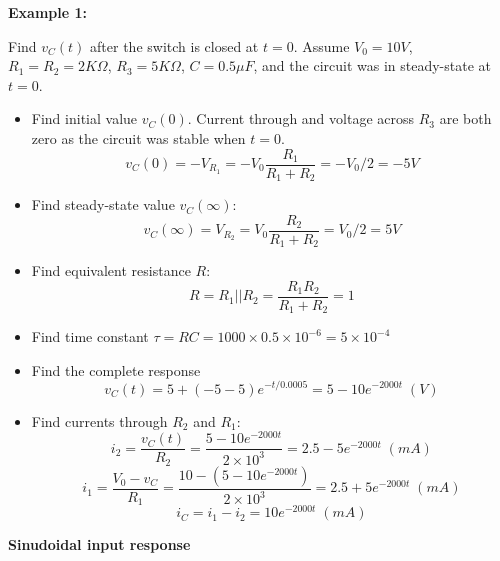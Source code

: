 {\bf Example 1:}

Find $v_C(t)$ after the switch is closed at $t=0$. Assume $V_0=10V$,
$R_1=R_2=2K\Omega$, $R_3=5K\Omega$, $C=0.5\mu F$, and the circuit was 
in steady-state at $t=0$. 


\begin{itemize}
\item Find initial value $v_C(0)$. Current through and voltage across
	$R_3$ are both zero as the circuit was stable when $t=0$.
\[	v_C(0)=-V_{R_1}=-V_0\frac{R_1}{R_1+R_2}=-V_0/2=-5V	\]
\item Find steady-state value $v_C(\infty)$:
\[	v_C(\infty)=V_{R_2}=V_0\frac{R_2}{R_1+R_2}=V_0/2=5V	\]
\item Find equivalent resistance $R$:
\[	R=R_1 || R_2=\frac{R_1 R_2}{R_1+R_2}=1	\]
\item Find time constant $\tau=RC=1000\times 0.5\times 10^{-6}=5\times 10^{-4}$
\item Find the complete response
\[	v_C(t)=5+(-5-5) e^{-t/0.0005}=5-10 e^{-2000t}\;(V)	\]
\item Find currents through $R_2$ and $R_1$:
\[	i_2=\frac{v_C(t)}{R_2}=\frac{5-10 e^{-2000t}}{2\times 10^3}
	=2.5-5 e^{-2000t}\; (mA)	\]
\[	i_1=\frac{V_0-v_C}{R_1}=\frac{10-(5-10 e^{-2000t})}{2\times 10^3}
	=2.5+5 e^{-2000t} \; (mA)	\]
\[	i_C=i_1-i_2=10 e^{-2000t} \; (mA)	\]
\end{itemize}

{\bf Sinudoidal input response}

